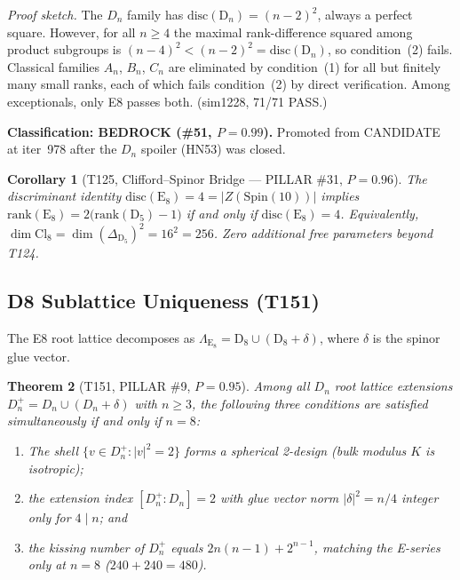 \documentclass[aps,prd,twocolumn,superscriptaddress,floatfix,nofootinbib]{revtex4-2}
\newtheorem{theorem}{Theorem}
\newtheorem{corollary}[theorem]{Corollary}
\theoremstyle{definition}
\theoremstyle{remark}
\begin{document}
\noindent
\textit{Proof sketch.}  The $D_n$ family has
$\mathrm{disc}(\mathrm{D}_n) = (n-2)^2$, always a perfect square.
However, for all $n \ge 4$ the maximal rank-difference squared among
product subgroups is $(n-4)^2 < (n-2)^2 = \mathrm{disc}(\mathrm{D}_n)$,
so condition~(2) fails.  Classical families $A_n$, $B_n$, $C_n$ are
eliminated by condition~(1) for all but finitely many small ranks, each
of which fails condition~(2) by direct verification.  Among exceptionals,
only E8 passes both.  (sim1228, 71/71 PASS.)

\textbf{Classification: BEDROCK (\#51, $P{=}0.99$).}
Promoted from CANDIDATE at iter~978 after the $D_n$ spoiler
(HN53) was closed.

\begin{corollary}[T125, Clifford--Spinor Bridge --- PILLAR \#31, $P{=}0.96$]
The discriminant identity $\mathrm{disc}(\mathrm{E}_8) = 4 = |Z(\mathrm{Spin}(10))|$
implies $\mathrm{rank}(\mathrm{E}_8) = 2\bigl(\mathrm{rank}(\mathrm{D}_5) - 1\bigr)$
if and only if $\mathrm{disc}(\mathrm{E}_8) = 4$.  Equivalently,
$\dim\mathrm{Cl}_8 = \dim(\Delta_{\mathrm{D}_5})^2 = 16^2 = 256$.
Zero additional free parameters beyond T124.
\end{corollary}

\subsection{D8 Sublattice Uniqueness (T151)}
\label{sec:d8-sublattice}

The E8 root lattice decomposes as
$\Lambda_{\mathrm{E}_8} = \mathrm{D}_8 \cup (\mathrm{D}_8 + \delta)$,
where $\delta$ is the spinor glue vector.

\begin{theorem}[T151, PILLAR \#9, $P{=}0.95$]
Among all $D_n$ root lattice extensions $D_n^+ = D_n \cup (D_n + \delta)$
with $n \ge 3$, the following three conditions are satisfied
simultaneously if and only if $n = 8$:
\begin{enumerate}
  \item The shell $\{v \in D_n^+ : |v|^2 = 2\}$ forms a
        spherical 2-design (bulk modulus $K$ is isotropic);
  \item the extension index $[D_n^+ : D_n] = 2$ with glue vector
        norm $|\delta|^2 = n/4$ integer only for $4 \mid n$; and
  \item the kissing number of $D_n^+$ equals $2n(n-1) + 2^{n-1}$,
        matching the E-series only at $n=8$ ($240 + 240 = 480$).
\end{enumerate}
\end{theorem}
\end{document}
